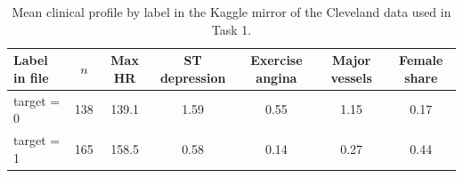 \begin{table}[h]
\caption{Mean clinical profile by label in the Kaggle mirror of the Cleveland data used in Task 1.}
\label{tab:labelcheck}
\small\setlength\tabcolsep{4pt}
\begin{tabular}{lcccccc}
\toprule
Label in file & $n$ & Max HR & ST depression & Exercise angina & Major vessels & Female share\\
\midrule
target = 0 & 138 & 139.1 & 1.59 & 0.55 & 1.15 & 0.17\\
target = 1 & 165 & 158.5 & 0.58 & 0.14 & 0.27 & 0.44\\
\bottomrule
\end{tabular}
\end{table}